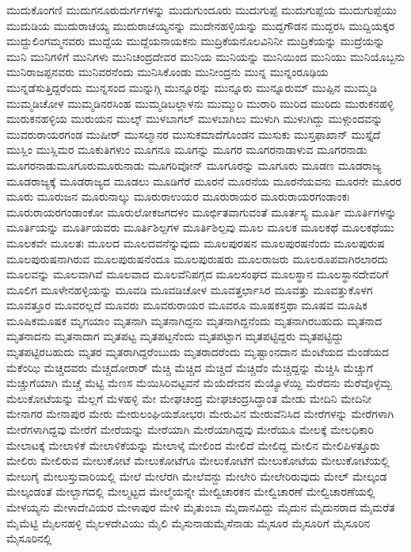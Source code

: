 {ಮುದುಕೊಂಗಣಿ
ಮುದುಗನೂರುದುರ್ಗಗಳನ್ನು
ಮುದುಗುಂದೂರು
ಮುದುಗುಪ್ಪೆ
ಮುದುಗುಪ್ಪೆಯ
ಮುದುಗುಪ್ಪೆಯು
ಮುದುಡಿಯ
ಮುದುರಾಚಯ್ಯ
ಮುದುರಾಚಯ್ಯನನ್ನು
ಮುದೇನಹಳ್ಳಿಯನ್ನು
ಮುದ್ದಗೌಡನ
ಮುದ್ದರಸಿ
ಮುದ್ದಿಯಕ್ಕರ
ಮುದ್ದುಲಿಂಗಮ್ಮನವರು
ಮುದ್ದೆಯ
ಮುದ್ದೆಯನಾಯಕನು
ಮುದ್ರಿಕೆಯನೊಲವಿನಿನೀ
ಮುದ್ರಿಕೆಯನ್ನು
ಮುದ್ರೆಯನ್ನು
ಮುನಿ
ಮುನಿಗಳಿಗೆ
ಮುನಿಗಳು
ಮುನಿಚಂದ್ರದೇವರ
ಮುನಿಯ
ಮುನಿಯನ್ನು
ಮುನಿಯಿಂದ
ಮುನಿಯು
ಮುನಿಯೊಬ್ಬನು
ಮುನಿರಾಜಪ್ಪನವರು
ಮುನಿವರನೆಂದು
ಮುನಿಸಿಕೊಂಡು
ಮುನೀಂದ್ರನು
ಮುನ್ನ
ಮುನ್ನಂರೂಢಿಯ
ಮುನ್ನಡೆಸುತ್ತಿದ್ದರೆಂದು
ಮುನ್ನಸಂದ
ಮುನ್ನುಗ್ಗಿ
ಮುನ್ನೂರನ್ನು
ಮುನ್ನೂರು
ಮುನ್ನೂರುಮ್
ಮುಪ್ಪಿನ
ಮುಮ್ಮಡಿ
ಮುಮ್ಮಡಿಚೋಳ
ಮುಮ್ಮಡಿನರಸಿಂಹ
ಮುಮ್ಮಡಿಬಲ್ಲಾಳನು
ಮುಮ್ಮುರಿ
ಮುರಾರಿ
ಮುರಿದ
ಮುರಿದು
ಮುರುಕನಹಳ್ಳಿ
ಮುರುಕನಹಳ್ಳಿಯ
ಮುರುಯನ
ಮುಲ್ಕ್
ಮುಳಬಾಗಲ್
ಮುಳಬಾಗಿಲು
ಮುಳುಗಿ
ಮುಳುಗಿದ್ದು
ಮುಳ್ಗುಂದವನ್ನು
ಮುವರುರಾಯರಗಂಡ
ಮುಷೀರ್
ಮುಸಲ್ಮಾನರ
ಮುಸುಕಮಾದೆಗೊಂಡನ
ಮುಸುಕು
ಮುಸ್ತಫಾಖಾನ್
ಮುಸ್ತೈದೆ
ಮುಸ್ಲಿಂ
ಮುಸ್ಲಿಮರ
ಮೂಕುತಿಗಳುಂ
ಮೂಗನೂ
ಮೂಗನ್ನು
ಮೂಗರ
ಮೂಗರನಾಡಾಳುವ
ಮೂಗರನಾಡು
ಮೂಗರನಾಡುಮೂಗೂರುಮೂರುನಾಡು
ಮೂಗರಿವೋನ್
ಮೂಗೂರನ್ನು
ಮೂಗೂರು
ಮೂಡಣ
ಮೂಡರಾಜ್ಯ
ಮೂಡರಾಜ್ಯಕ್ಕೆ
ಮೂಡರಾಜ್ಯದ
ಮೂಡಲು
ಮೂಡಿಗೆರೆ
ಮೂರನೆ
ಮೂರನೆಯ
ಮೂರನೆಯವನು
ಮೂರನೇ
ಮೂರರ
ಮೂರು
ಮೂರುಜನ
ಮೂರುನಾಲ್ಕು
ಮೂರುರಾಉಯರ
ಮೂರುರಾಯರ
ಮೂರುರಾಯರಗಂಡಾಂಕಃ
ಮೂರುರಾಯರಗಂಡಾಂಕೋ
ಮೂರುಲೋಕಜಗದಳಂ
ಮೂರ್ಛಿತವಾಗುವಂತೆ
ಮೂರ್ತಸ್ಯ
ಮೂರ್ತಿ
ಮೂರ್ತಿಗಳನ್ನು
ಮೂರ್ತಿಯನ್ನು
ಮೂರ್ತಿಯವರು
ಮೂರ್ತಿಶಿಲ್ಪಗಳ
ಮೂರ್ತಿಶಿಲ್ಪವು
ಮೂಲ
ಮೂಲಕ
ಮೂಲಕಥೆ
ಮೂಲಕಥೆಯು
ಮೂಲಕವೇ
ಮೂಲತಃ
ಮೂಲದ
ಮೂಲದವನೆನ್ನುವುದು
ಮೂಲಪುರಷನ
ಮೂಲಪುರಷನೆಂದು
ಮೂಲಪುರುಷ
ಮೂಲಪುರುಷನಾಗಿರುವ
ಮೂಲಪುರುಷನೆಂದೂ
ಮೂಲಪುರುಷರು
ಮೂಲರಾಜರು
ಮೂಲರೂಪವಾಗಿರಲಾರದು
ಮೂಲವನ್ನು
ಮೂಲವಾಗಿವೆ
ಮೂಲವಾದ
ಮೂಲವೆನಿಪಗ್ಗದ
ಮೂಲಸಂಘದ
ಮೂಲಸ್ಥಾನ
ಮೂಲಸ್ಥಾನದೇವರಿಗೆ
ಮೂಲಿಗ
ಮೂಳೇನಹಳ್ಳಿಯನ್ನು
ಮೂವಡಿ
ಮೂವಡಿಚೋಳ
ಮೂವತ್ತರ್ಛಾಸಿರ
ಮೂವತ್ತು
ಮೂವತ್ತುಕೊಳಗ
ಮೂವತ್ತೂರ
ಮೂವರಲ್ಲದೆ
ಮೂವರು
ಮೂವರುರಾಯರ
ಮೂವರೂ
ಮೂಷಕಸ್ತಥಾ
ಮೂಷವ
ಮೂಷಿಕ
ಮೂಷಿಕಮೂಷಕ
ಮೃಗಯಾಂ
ಮೃತನಾಗಿ
ಮೃತನಾಗಿದ್ದನು
ಮೃತನಾಗಿದ್ದನೆಂದು
ಮೃತನಾಗಿರಬಹುದು
ಮೃತನಾದ
ಮೃತನಾದನು
ಮೃತನಾದಾಗ
ಮೃತಪಟ್ಟ
ಮೃತಪಟ್ಟನೆಂದು
ಮೃತಪಟ್ಟಾಗ
ಮೃತಪಟ್ಟಿದ್ದರು
ಮೃತಪಟ್ಟಿದ್ದು
ಮೃತಪಟ್ಟಿರಬಹುದು
ಮೃತರ
ಮೃತರಾಗಿದ್ದರೆಂಬುದು
ಮೃತರಾದರೆಂದು
ಮೃಷ್ಟಾಂನದಾನ
ಮೆಂಟೆಯದ
ಮೆಂಡೆಯದ
ಮೆಕೆಂಝಿ
ಮೆಚ್ಚದವರು
ಮೆಚ್ಚದೋರಾರ್
ಮೆಚ್ಚಿ
ಮೆಚ್ಚಿದ
ಮೆಚ್ಚಿದೆ
ಮೆಚ್ಚಿದೆಂ
ಮೆಚ್ಚಿದ್ದನ್ನು
ಮೆಚ್ಚಿಸಿ
ಮೆಚ್ಚುಗೆ
ಮೆಚ್ಚುಗೆಯಾಗಿ
ಮೆಚ್ಚೆ
ಮೆಟ್ಟಿ
ಮೆಣಸ
ಮೆಯಿಸಿರಿವಟ್ಟವನೆ
ಮೆಯೆದೇವನ
ಮೆಯ್ಯೊಳೆಯ್ದಿ
ಮೆರೆದನು
ಮೆರೆವೊಳ್ಳೆಮ್ಬ
ಮೆಲುಕೋಟೆಯನ್ನು
ಮೆಲ್ಲಗೆ
ಮೆಳಹಳ್ಳಿ
ಮೇ
ಮೇಘಚಂದ್ರ
ಮೇಘಚಂದ್ರಸಿದ್ಧಾಂತ
ಮೇಡು
ಮೇದಿನಿ
ಮೇದಿನೀ
ಮೇನಾಗರ
ಮೇನಾಪುರ
ಮೇರು
ಮೇರುಲಂಘಿಯಶೋಭರಃ
ಮೇರುವಿನ
ಮೇರುವೆನಿಸಿದ
ಮೇರೆಗಳನ್ನು
ಮೇರೆಗಳಾಗಿ
ಮೇರೆಗಳಾಗಿದ್ದವು
ಮೇರೆಗೆ
ಮೇರೆಯನ್ನು
ಮೇರೆಯಾಗಿ
ಮೇರೆಯಾಗಿದ್ದವು
ಮೇರೆಯೂ
ಮೇಲಕ್ಕೆ
ಮೇಲಧಿಕಾರಿ
ಮೇಲಾಟಕ್ಕೆ
ಮೇಲಾಳಿಕೆ
ಮೇಲಾಳಿಕೆಯನ್ನು
ಮೇಲಾಳ್ಕೆ
ಮೇಲಿಂದ
ಮೇಲಿದೆ
ಮೇಲಿದ್ದ
ಮೇಲಿನ
ಮೇಲಿಪಿಳತ್ತೂರು
ಮೇಲಿರು
ಮೇಲಿರುವ
ಮೇಲುಕೋಟೆ
ಮೇಲುಕೋಟೆಗೂ
ಮೇಲುಕೋಟೆಗೆ
ಮೇಲುಕೋಟೆಯ
ಮೇಲುಕೋಟೆಯಲ್ಲಿ
ಮೇಲುಗೈ
ಮೇಲುಸ್ತುವಾರಿಯಲ್ಲಿ
ಮೇಲೆ
ಮೇಲೆರಗಿ
ಮೇಲೆವನ್ದು
ಮೇಲೇರಿ
ಮೇಲೇರಿರುವುದು
ಮೇಲ್
ಮೇಲ್ಕಂಡ
ಮೇಲ್ಕಂಡಂತೆ
ಮೇಲ್ಬಾಗದಲ್ಲಿ
ಮೇಲ್ಮಟ್ಟದ
ಮೇಲ್ಮೆಯನ್ನೇ
ಮೇಲ್ವಿಚಾರಕನ
ಮೇಲ್ವಿಚಾರಣೆ
ಮೇಲ್ವಿಚಾರಣೆಯಲ್ಲಿ
ಮೇಳಯ್ಯನು
ಮೇಳಾದೇವಿಯರ
ಮೇಳಾಪುರ
ಮೇಳಿ
ಮೈತುಂಬಾ
ಮೈದಾನವಿದ್ದು
ಮೈದುನ
ಮೈದುನರಾದ
ಮೈಮರೆತ
ಮೈಮೆಟ್ಟಿ
ಮೈಲನಹಳ್ಳಿ
ಮೈಲಳದೇವಿಯು
ಮೈಲಿ
ಮೈಸುನಾಡುಮೈಸೆನಾಡು
ಮೈಸೂರ
ಮೈಸೂರಿಗೆ
ಮೈಸೂರಿನ
ಮೈಸೂರಿನಲ್ಲಿ
}
